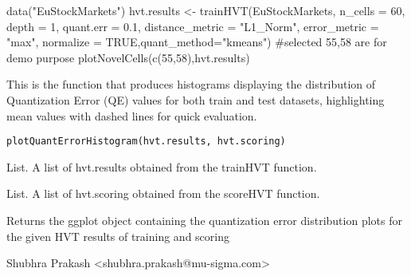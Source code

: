 \documentclass[letterpaper]{book}
\begin{document}
%
\begin{Examples}
\begin{ExampleCode}
data("EuStockMarkets")
hvt.results <- trainHVT(EuStockMarkets, n_cells = 60, depth = 1, quant.err = 0.1, 
                       distance_metric = "L1_Norm", error_metric = "max",
                       normalize = TRUE,quant_method="kmeans")
#selected 55,58 are for demo purpose
plotNovelCells(c(55,58),hvt.results)
\end{ExampleCode}
\end{Examples}
%
\begin{Description}
This is the function that produces histograms displaying the distribution of Quantization Error (QE) values 
for both train and test datasets, highlighting mean values with dashed lines for quick evaluation.
\end{Description}
%
\begin{Usage}
\begin{verbatim}
plotQuantErrorHistogram(hvt.results, hvt.scoring)
\end{verbatim}
\end{Usage}
%
\begin{Arguments}
\begin{ldescription}
\item[\code{hvt.results}] List. A list of hvt.results obtained from the trainHVT function.

\item[\code{hvt.scoring}] List. A list of hvt.scoring obtained from the scoreHVT function.
\end{ldescription}
\end{Arguments}
%
\begin{Value}
Returns the ggplot object containing the quantization error distribution plots for 
the given HVT results of training and scoring
\end{Value}
%
\begin{Author}
Shubhra Prakash <shubhra.prakash@mu-sigma.com>
\end{Author}
%
\begin{SeeAlso}
\end{SeeAlso}
%
\end{document}
